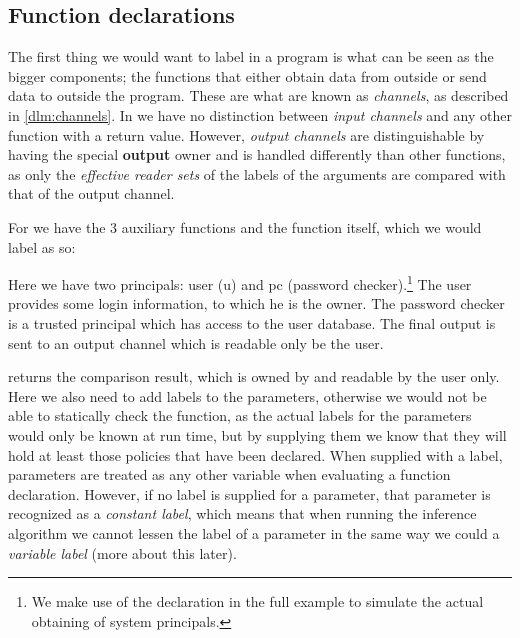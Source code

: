 



\subsection{Function declarations}
The first thing we would want to label in a program is what can be seen as the bigger components; the functions that either obtain data from outside or send data to outside the program.
These are what are known as \emph{channels}, as described in \cref{dlm:channels}.
In \thelang{} we have no distinction between \emph{input channels} and any other function with a return value.
However, \emph{output channels} are distinguishable by having the special \textbf{output} owner and is handled differently than other functions, as only the \emph{effective reader sets} of the labels of the arguments are compared with that of the output channel.

For  we have the 3 auxiliary functions and the  function itself, which we would label as so:\\
\begin{minipage}{\linewidth}

\end{minipage}

Here we have two principals: user (u) and pc (password checker).\footnote{We make use of the  declaration in the full example to simulate the actual obtaining of system principals.}
The user provides some login information, to which he is the owner.
The password checker is a trusted principal which has access to the user database.
The final output is sent to an output channel which is readable only be the user.

 returns the comparison result, which is owned by and readable by the user only.
Here we also need to add labels to the parameters, otherwise we would not be able to statically check the function, as the actual labels for the parameters would only be known at run time, but by supplying them we know that they will hold at least those policies that have been declared.
When supplied with a label, parameters are treated as any other variable when evaluating a function declaration.
However, if no label is supplied for a parameter, that parameter is recognized as a \emph{constant label}, which means that when running the inference algorithm we cannot lessen the label of a parameter in the same way we could a \emph{variable label} (more about this later).

